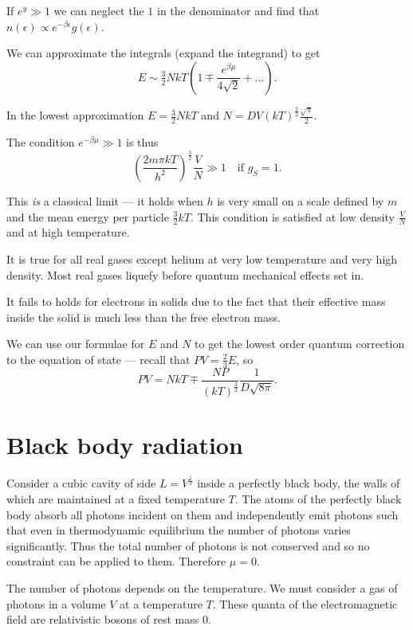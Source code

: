\documentclass{notes}
\begin{document}
If $e^{y} \gg 1$ we can neglect the $1$ in the denominator
and find that $n(\epsilon) \propto e^{-\beta \epsilon} g(\epsilon)$.

We can approximate the integrals (expand the integrand)
to get
\[
E \sim \tfrac{3}{2} N k T \left( 1 \mp \frac{e^{\beta \mu}}{4 \sqrt{2}} +
\dots \right).
\]

In the lowest approximation $E = \tfrac{3}{2} N k T$ and
$N = D V ( k T)^{\frac{3}{2}} \tfrac{\sqrt{\pi}}{2}$.

The condition $e^{-\beta \mu} \gg 1$ is thus
\[
\left( \frac{2 m \pi k T}{h^2} \right)^{\frac{3}{2}} \frac{V}{N} \gg 1
\quad \text{if $g_S = 1$.}
\]

This \emph{is} a classical limit --- it holds when
$h$ is very small on a scale defined by $m$ and the
mean energy per particle $\tfrac{3}{2} k T$.  This condition is
satisfied at low density $\tfrac{V}{N}$ and at high temperature.

It is true for all real gases except helium at very low temperature
and very high density.  Most real gases liquefy before quantum mechanical
effects set in.

It fails to holds for electrons in solids due to the fact that
their effective mass inside the solid is much less than the free
electron mass.

We can use our formulae for $E$ and $N$ to get the lowest
order quantum correction to the equation of state --- recall that
$P V = \tfrac{2}{3} E$, so
\[
P V = N k T \mp \frac{N P}{( k T)^{\frac{3}{2}}} \frac{1}{D \sqrt{8 \pi}}.
\]

\section{Black body radiation}

Consider a cubic cavity of side $L = V^{\frac{1}{3}}$ inside a perfectly
black body, the walls of which are maintained at a fixed temperature $T$.
The atoms of the perfectly black body absorb all photons incident on them
and independently emit photons such that even in thermodynamic equilibrium
the number of photons varies significantly.  Thus the total number of
photons is not conserved and so no constraint can be applied to them.
Therefore $\mu = 0$.

The number of photons depends on the temperature.  We must consider
a gas of photons in a volume $V$ at a temperature $T$.  These quanta
of the electromagnetic field are relativistic bosons of rest mass $0$.
\end{document}
